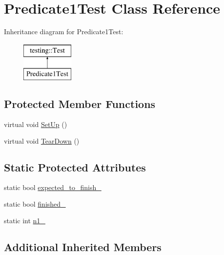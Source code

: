 \hypertarget{class_predicate1_test}{\section{Predicate1\-Test Class Reference}
\label{class_predicate1_test}
}
Inheritance diagram for Predicate1\-Test\-:\begin{figure}[H]
\begin{center}
\leavevmode
\includegraphics[height=2.000000cm]{class_predicate1_test}
\end{center}
\end{figure}
\subsection*{Protected Member Functions}
\begin{DoxyCompactItemize}
\item 
virtual void \hyperlink{class_predicate1_test_a481704a09f73a37158513f9a336dbdd9}{Set\-Up} ()
\item 
virtual void \hyperlink{class_predicate1_test_ad2974af5c6abc508847c3a9912b24a90}{Tear\-Down} ()
\end{DoxyCompactItemize}
\subsection*{Static Protected Attributes}
\begin{DoxyCompactItemize}
\item 
static bool \hyperlink{class_predicate1_test_ad91cfa58e6352d53abacce32df2ef635}{expected\-\_\-to\-\_\-finish\-\_\-}
\item 
static bool \hyperlink{class_predicate1_test_a6d45fb2d1f01a5c8baf28f60039c244e}{finished\-\_\-}
\item 
static int \hyperlink{class_predicate1_test_a528d9f7f618b17802962a3824eea11e3}{n1\-\_\-}
\end{DoxyCompactItemize}
\subsection*{Additional Inherited Members}


